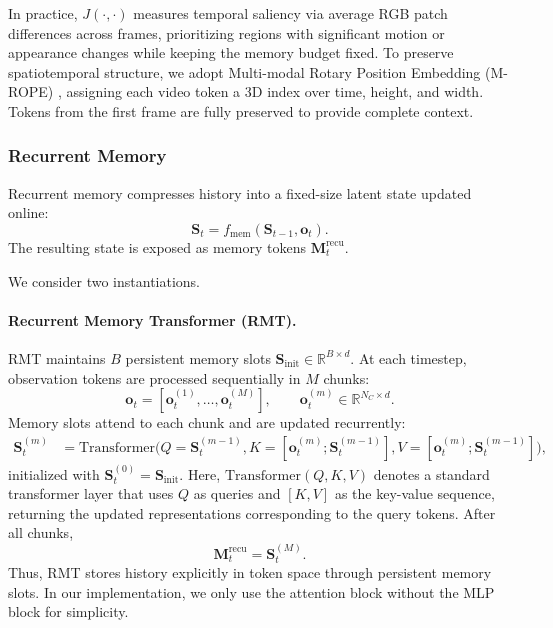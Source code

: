 In practice, $J(\cdot,\cdot)$ measures temporal saliency via average RGB patch differences across frames, prioritizing regions with significant motion or appearance changes while keeping the memory budget fixed. To preserve spatiotemporal structure, we adopt Multi-modal Rotary Position Embedding (M-ROPE) \cite{yao2025timechat}, assigning each video token a 3D index over time, height, and width. Tokens from the first frame are fully preserved to provide complete context.


\subsubsection{Recurrent Memory}

Recurrent memory compresses history into a fixed-size latent state updated online:
\[
\mathbf{S}_t = f_{\text{mem}}(\mathbf{S}_{t-1}, \mathbf{o}_t).
\]
The resulting state is exposed as memory tokens $\mathbf{M}_t^{\text{recu}}$.

We consider two instantiations.

\paragraph{Recurrent Memory Transformer (RMT).}
RMT maintains $B$ persistent memory slots
$\mathbf{S}_{\text{init}} \in \mathbb{R}^{B \times d}$.
At each timestep, observation tokens are processed sequentially in $M$ chunks:
\[
\mathbf{o}_t = [\mathbf{o}_t^{(1)}, \dots, \mathbf{o}_t^{(M)}], \qquad
\mathbf{o}_t^{(m)} \in \mathbb{R}^{N_C \times d}.
\]
Memory slots attend to each chunk and are updated recurrently:
\begin{align}
\mathbf{S}_t^{(m)}
&= \mathrm{Transformer}\big(
Q=\mathbf{S}_t^{(m-1)},
K=[\mathbf{o}_t^{(m)};\mathbf{S}_t^{(m-1)}],
V=[\mathbf{o}_t^{(m)};\mathbf{S}_t^{(m-1)}]
\big),
\end{align}
initialized with $\mathbf{S}_t^{(0)}=\mathbf{S}_{\text{init}}$.
Here, $\mathrm{Transformer}(Q, K, V)$ denotes a standard transformer layer that uses $Q$ as queries and $[K, V]$ as the key-value sequence, returning the updated representations corresponding to the query tokens.
After all chunks,
\[
\mathbf{M}_t^{\text{recu}} = \mathbf{S}_t^{(M)}.
\]
Thus, RMT stores history explicitly in token space through persistent memory slots. In our implementation, we only use the attention block without the MLP block for simplicity. 

